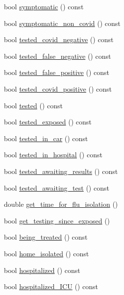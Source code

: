 \begin{DoxyCompactItemize}
\item 
bool \hyperlink{classAgent_a427f98315b8d12694f1fccce03146861}{symptomatic} () const
\item 
bool \hyperlink{classAgent_ae8139e7f0ac3f2520c32e7f818d9ff98}{symptomatic\+\_\+non\+\_\+covid} () const
\item 
bool \hyperlink{classAgent_acc6bdb2ede4c49bc01165d5abe140ba1}{tested\+\_\+covid\+\_\+negative} () const
\item 
bool \hyperlink{classAgent_a0cb482555c25432c955ddceb0e62b22a}{tested\+\_\+false\+\_\+negative} () const
\item 
bool \hyperlink{classAgent_a89acf837bb933fa98d2809756d18725c}{tested\+\_\+false\+\_\+positive} () const
\item 
bool \hyperlink{classAgent_a85729b0c8074193bd08862a74eedfabf}{tested\+\_\+covid\+\_\+positive} () const
\item 
bool \hyperlink{classAgent_a8d923964a5c19abcddb6112d14eb9d1c}{tested} () const
\item 
bool \hyperlink{classAgent_aaeda593b535a41928499198c60bff028}{tested\+\_\+exposed} () const
\item 
bool \hyperlink{classAgent_a26b171ab3306fed7c3cbb620fba91417}{tested\+\_\+in\+\_\+car} () const
\item 
bool \hyperlink{classAgent_a753cbb74c489c5eadcec54b2a4f628a1}{tested\+\_\+in\+\_\+hospital} () const
\item 
bool \hyperlink{classAgent_a951c13f5e8e6ee90f0e6277a65c00c00}{tested\+\_\+awaiting\+\_\+results} () const
\item 
bool \hyperlink{classAgent_ad1c8a934667f5db54faa8505db10086d}{tested\+\_\+awaiting\+\_\+test} () const
\item 
double \hyperlink{classAgent_aa35e17354f856cd391d42e611619c0e6}{get\+\_\+time\+\_\+for\+\_\+flu\+\_\+isolation} ()
\item 
bool \hyperlink{classAgent_a05506fff0bf91da5ef02c899f3d53fda}{get\+\_\+testing\+\_\+since\+\_\+exposed} ()
\item 
bool \hyperlink{classAgent_ab13f3252bc27a334a9be7192c79a5b3d}{being\+\_\+treated} () const
\item 
bool \hyperlink{classAgent_a8447e6cb0bfcc4f31ad528da5ce166b1}{home\+\_\+isolated} () const
\item 
bool \hyperlink{classAgent_ad4253627a5c7f339f79617d9da7df34d}{hospitalized} () const
\item 
bool \hyperlink{classAgent_a25a7e8adabf00b2de152410b6293e767}{hospitalized\+\_\+\+I\+CU} () const

\end{DoxyCompactItemize}

